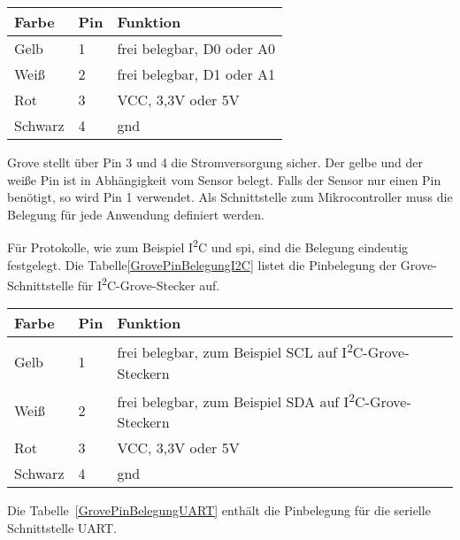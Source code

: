    \begin{center}
        \begin{tabular}{l|l|l}
            Farbe & Pin & Funktion \\ \hline
            Gelb    & 1   & frei belegbar, D0 oder A0 \\
            Weiß    & 2   & frei belegbar, D1 oder A1 \\
            Rot     & 3   &   VCC,  3,3V oder 5V \\
            Schwarz & 4   & \acs{gnd} \\
            
        \end{tabular}
        \label{PinBelegungGrove}
    \end{center}

Grove stellt über Pin 3 und 4 die Stromversorgung sicher. Der gelbe und der weiße Pin ist in Abhängigkeit vom Sensor belegt. Falls der Sensor nur einen Pin benötigt, so wird Pin 1 verwendet.  Als Schnittstelle zum Mikrocontroller muss die Belegung für jede Anwendung definiert werden. 

Für Protokolle, wie zum Beispiel I\textsuperscript{2}C und \ac{spi}, sind die Belegung eindeutig festgelegt. Die Tabelle\ref{GrovePinBelegungI2C} listet die Pinbelegung der Grove-Schnittstelle für I\textsuperscript{2}C-Grove-Stecker auf.

\begin{center}
    \begin{tabular}{l|l|l}
        Farbe & Pin & Funktion \\ \hline
        Gelb    & 1   & frei belegbar, zum Beispiel SCL auf I\textsuperscript{2}C-Grove-Steckern \\
        Weiß    & 2   & frei belegbar, zum Beispiel SDA auf I\textsuperscript{2}C-Grove-Steckern \\
        Rot     & 3   &   VCC,  3,3V oder 5V \\
        Schwarz & 4   & \acs{gnd} \\
        
    \end{tabular}
    \label{GrovePinBelegungI2C}
\end{center}

Die Tabelle~\ref{GrovePinBelegungUART} enthält die Pinbelegung für die serielle Schnittstelle UART.

